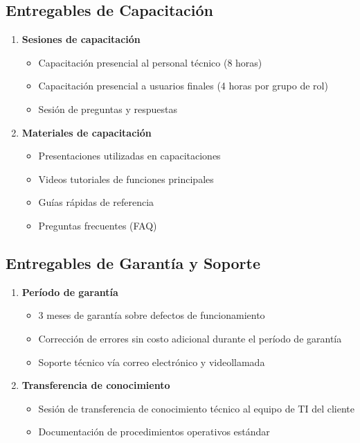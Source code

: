 \documentclass[12pt,letterpaper]{article}
\begin{document}
\subsection{Entregables de Capacitación}

\begin{enumerate}
    \item \textbf{Sesiones de capacitación}
    \begin{itemize}
        \item Capacitación presencial al personal técnico (8 horas)
        \item Capacitación presencial a usuarios finales (4 horas por grupo de rol)
        \item Sesión de preguntas y respuestas
    \end{itemize}
    
    \item \textbf{Materiales de capacitación}
    \begin{itemize}
        \item Presentaciones utilizadas en capacitaciones
        \item Videos tutoriales de funciones principales
        \item Guías rápidas de referencia
        \item Preguntas frecuentes (FAQ)
    \end{itemize}
\end{enumerate}

\newpage
\subsection{Entregables de Garantía y Soporte}

\begin{enumerate}
    \item \textbf{Período de garantía}
    \begin{itemize}
        \item 3 meses de garantía sobre defectos de funcionamiento
        \item Corrección de errores sin costo adicional durante el período de garantía
        \item Soporte técnico vía correo electrónico y videollamada
    \end{itemize}
    
    \item \textbf{Transferencia de conocimiento}
    \begin{itemize}
        \item Sesión de transferencia de conocimiento técnico al equipo de TI del cliente
        \item Documentación de procedimientos operativos estándar
    \end{itemize}
\end{enumerate}
\end{document}
